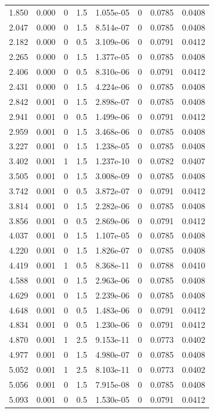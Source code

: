 \documentclass[preview]{standalone}
\begin{document}
{{\begin{tabular}{L{1.2cm}C{1.2cm} C{0.3cm}C{0.5cm} C{1.4cm}C{1.4cm} C{1.4cm}C{1.4cm}}
  1.850  &  0.000  & 0     & 1.5 &  1.055e-05  & 0  & 0.0785 &  0.0408   \\ 
  2.047  &  0.000  & 0     & 1.5 &  8.514e-07  & 0  & 0.0785 &  0.0408   \\ 
  2.182  &  0.000  & 0     & 0.5 &  3.109e-06  & 0  & 0.0791 &  0.0412   \\ 
  2.265  &  0.000  & 0     & 1.5 &  1.377e-05  & 0  & 0.0785 &  0.0408   \\ 
  2.406  &  0.000  & 0     & 0.5 &  8.310e-06  & 0  & 0.0791 &  0.0412   \\ 
  2.431  &  0.000  & 0     & 1.5 &  4.224e-06  & 0  & 0.0785 &  0.0408   \\ 
  2.842  &  0.001  & 0     & 1.5 &  2.898e-07  & 0  & 0.0785 &  0.0408   \\ 
  2.941  &  0.001  & 0     & 0.5 &  1.499e-06  & 0  & 0.0791 &  0.0412   \\ 
  2.959  &  0.001  & 0     & 1.5 &  3.468e-06  & 0  & 0.0785 &  0.0408   \\ 
  3.227  &  0.001  & 0     & 1.5 &  1.238e-05  & 0  & 0.0785 &  0.0408   \\ 
  3.402  &  0.001  & 1     & 1.5 &  1.237e-10  & 0  & 0.0782 &  0.0407   \\ 
  3.505  &  0.001  & 0     & 1.5 &  3.008e-09  & 0  & 0.0785 &  0.0408   \\ 
  3.742  &  0.001  & 0     & 0.5 &  3.872e-07  & 0  & 0.0791 &  0.0412   \\ 
  3.814  &  0.001  & 0     & 1.5 &  2.282e-06  & 0  & 0.0785 &  0.0408   \\ 
  3.856  &  0.001  & 0     & 0.5 &  2.869e-06  & 0  & 0.0791 &  0.0412   \\ 
  4.037  &  0.001  & 0     & 1.5 &  1.107e-05  & 0  & 0.0785 &  0.0408   \\ 
  4.220  &  0.001  & 0     & 1.5 &  1.826e-07  & 0  & 0.0785 &  0.0408   \\ 
  4.419  &  0.001  & 1     & 0.5 &  8.368e-11  & 0  & 0.0788 &  0.0410   \\ 
  4.588  &  0.001  & 0     & 1.5 &  2.963e-06  & 0  & 0.0785 &  0.0408   \\ 
  4.629  &  0.001  & 0     & 1.5 &  2.239e-06  & 0  & 0.0785 &  0.0408   \\ 
  4.648  &  0.001  & 0     & 0.5 &  1.483e-06  & 0  & 0.0791 &  0.0412   \\ 
  4.834  &  0.001  & 0     & 0.5 &  1.230e-06  & 0  & 0.0791 &  0.0412   \\ 
  4.870  &  0.001  & 1     & 2.5 &  9.153e-11  & 0  & 0.0773 &  0.0402   \\ 
  4.977  &  0.001  & 0     & 1.5 &  4.980e-07  & 0  & 0.0785 &  0.0408   \\ 
  5.052  &  0.001  & 1     & 2.5 &  8.103e-11  & 0  & 0.0773 &  0.0402   \\ 
  5.056  &  0.001  & 0     & 1.5 &  7.915e-08  & 0  & 0.0785 &  0.0408   \\ 
  5.093  &  0.001  & 0     & 0.5 &  1.530e-05  & 0  & 0.0791 &  0.0412   \\ 
\hline 
\end{tabular} 

}}
\end{document}

